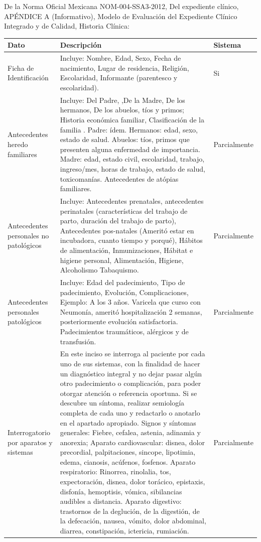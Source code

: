 De la Norma Oficial Mexicana NOM-004-SSA3-2012, Del expediente clínico, APÉNDICE A (Informativo), Modelo de Evaluación del Expediente Clínico Integrado y de Calidad, Historia Clínica:

\setlength\LTleft{-0.6cm}
\begin{longtable}{|p{4cm}|p{10cm}|p{3cm}|}
\hline\textbf{Dato} & \textbf{Descripción} & \textbf{Sistema} \\ \hline
Ficha de Identificación
& Incluye: Nombre, Edad, Sexo, Fecha de nacimiento, Lugar de residencia, Religión, Escolaridad, Informante (parentesco y escolaridad).
& Si\\ \hline

Antecedentes heredo familiares
& Incluye: Del Padre, ,De la Madre, De los hermanos, De los abuelos, tíos y primos; Historia económica familiar, Clasificación de la familia . Padre: ídem. Hermanos: edad, sexo, estado de salud. Abuelos: tíos, primos que presenten alguna enfermedad de importancia. Madre: edad, estado civil, escolaridad, trabajo, ingreso/mes, horas de trabajo, estado de salud, toxicomanías. Antecedentes de atópias familiares.
& Parcialmente\\ \hline

Antecedentes personales no patológicos
& Incluye: Antecedentes prenatales, antecedentes perinatales (características del trabajo de parto, duración del trabajo de parto), Antecedentes pos-natales (Ameritó estar en incubadora, cuanto tiempo y porqué), Hábitos de alimentación, Inmunizaciones, Hábitat e higiene personal, Alimentación, Higiene, Alcoholismo Tabaquismo.
& Parcialmente\\ \hline

Antecedentes personales patológicos
& Incluye: Edad del padecimiento, Tipo de padecimiento, Evolución, Complicaciones, Ejemplo: A los 3 años. Varicela  que curso con Neumonía, ameritó hospitalización 2 semanas, posteriormente evolución satisfactoria. Padecimientos traumáticos, alérgicos y de transfusión. 
& Parcialmente\\ \hline

 Interrogatorio por aparatos y sistemas
& En este inciso se interroga al paciente por cada uno de sus sistemas, con la finalidad de hacer un diagnóstico integral y no dejar pasar algún otro padecimiento o complicación, para poder otorgar atención o referencia oportuna. Si se descubre un síntoma, realizar semiología completa de cada uno y redactarlo o anotarlo en el apartado apropiado. 
\newline\newline Signos y síntomas generales: Fiebre, cefalea, astenia, adinamia y anorexia; Aparato cardiovascular: disnea, dolor precordial, palpitaciones, sincope, lipotimia, edema, cianosis, acúfenos, fosfenos.  Aparato respiratorio: Rinorrea, rinolalia, tos, expectoración, disnea, dolor torácico, epistaxis, disfonía, hemoptisis, vómica, sibilancias audibles a distancia. Aparato digestivo: trastornos de la deglución, de la digestión, de la defecación, nausea, vómito, dolor abdominal, diarrea, constipación, ictericia, rumiación.
& Parcialmente\\ \hline


\end{longtable}
